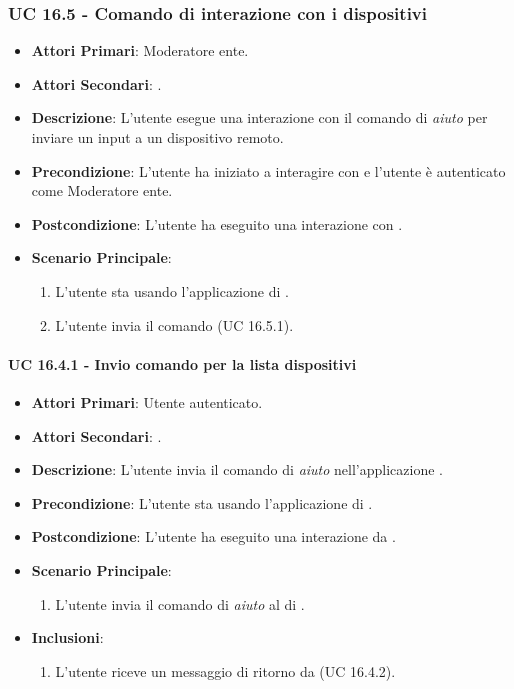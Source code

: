 	\subsubsection{UC 16.5 - Comando di interazione con i dispositivi}
	\begin{itemize}
		\item \textbf{Attori Primari}: Moderatore ente.
		\item \textbf{Attori Secondari}: .
		\item \textbf{Descrizione}: L'utente esegue una interazione con il comando di \textit{aiuto} per inviare un input a un dispositivo remoto.
		\item \textbf{Precondizione}: L'utente ha iniziato a interagire con  e l'utente è autenticato come Moderatore ente.
		\item \textbf{Postcondizione}: L'utente ha eseguito una interazione con .
		\item \textbf{Scenario Principale}:
		\begin{enumerate}
			\item L'utente sta usando l'applicazione di . 
			\item L'utente invia il comando (UC 16.5.1).
		\end{enumerate}
	\end{itemize}


		\paragraph{UC 16.4.1 - Invio comando per la lista dispositivi}
		\begin{itemize}
			\item \textbf{Attori Primari}: Utente autenticato.
			\item \textbf{Attori Secondari}: .
			\item \textbf{Descrizione}: L'utente invia il comando di \textit{aiuto} nell'applicazione .
			\item \textbf{Precondizione}: L'utente sta usando l'applicazione di .
			\item \textbf{Postcondizione}: L'utente ha eseguito una interazione da .
			\item \textbf{Scenario Principale}:
			\begin{enumerate}
				\item L'utente invia il comando di \textit{aiuto} al  di .
			\end{enumerate}
			\item \textbf{Inclusioni}:
			\begin{enumerate}
				\item L'utente riceve un messaggio di ritorno da  (UC 16.4.2).
			\end{enumerate}
		\end{itemize}

